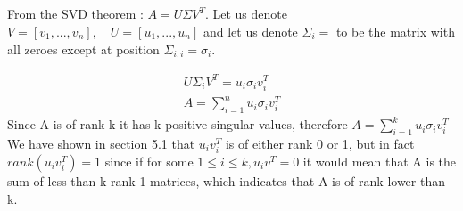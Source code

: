 \documentclass{article}
\begin{document}
\subsection{}
	From the SVD theorem : 
	$A=U\Sigma V^{T}.$
	Let us denote $V=[v_{1}, ... ,v_{n}],\quad U=[u_{1}, ... ,u_{n}]$ and let us denote $\Sigma_{i}=$ to be the matrix with all zeroes except at position $\Sigma_{i,i} =\sigma_{i}.$
	
	\begin{gather*}
	U\Sigma_{i}V^{T}=u_{i}\sigma_{i}v_{i}^{T}
	\\A=\sum_{i=1}^{n}u_{i}\sigma_{i}v_{i}^T	
	\end{gather*}
	Since A is of rank k it has k positive singular values, therefore 
	$A=\sum_{i=1}^{k}u_{i}\sigma_{i}v_{i}^T$
	We have shown in section 5.1 that $u_iv_i^T$ is of either rank 0 or 1, but in fact $rank(u_iv_i^T)=1$ since if for some $1 \leq i \leq k, u_iv^{T}=0$ it would mean that A is the sum of less than k rank 1 matrices, which indicates that A is of rank lower than k.
\end{document}
